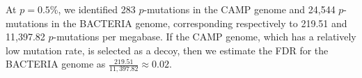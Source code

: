 At $p=0.5$\%, we identified 283 $p$-mutations in the CAMP genome and 24,544 $p$-mutations in the BACTERIA genome, corresponding respectively to 219.51 and 11,397.82 $p$-mutations per megabase. If the CAMP genome, which has a relatively low mutation rate, is selected as a decoy, then we estimate the FDR for the BACTERIA genome as $\frac{219.51}{11,397.82} \approx 0.02$.\endinput